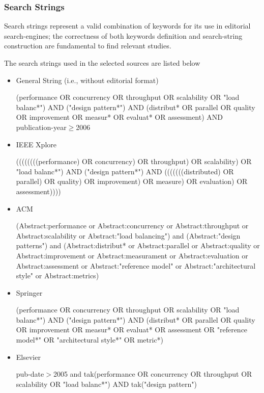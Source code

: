 \subsubsection{Search Strings}
\label{subsec:searchstrings}
Search strings represent a valid combination of keywords for its use in editorial search-engines; the correctness of both keywords definition and search-string construction are fundamental to find relevant studies.

The search strings used in the selected sources are listed below


\begin{itemize}
	
	\item General String (i.e., without editorial format)
	
	(performance OR concurrency OR throughput OR scalability OR "load balanc*") AND ("design pattern*") AND (distribut* OR parallel OR quality OR improvement OR measur* OR evaluat* OR assessment) AND publication-year$\geq$2006 \label{seastr:general} 
	
	\item IEEE Xplore
	
	((((((((performance) OR concurrency) OR throughput) OR scalability) OR "load balanc*") AND ("design pattern*") AND (((((((distributed) OR parallel) OR quality) OR improvement) OR measure) OR evaluation) OR assessment)))) \label{seastr:IEEE} 
	
	\item ACM
	
	(Abstract:performance or Abstract:concurrency or Abstract:throughput or Abstract:scalability or Abstract:"load balancing") and (Abstract:"design patterns") and (Abstract:distribut* or Abstract:parallel or Abstract:quality or Abstract:improvement or Abstract:measurament or Abstract:evaluation or Abstract:assessment or Abstract:"reference model" or Abstract:"architectural style" or Abstract:metrics) \label{seastr:ACM} 
	
	\item Springer
	
	(performance OR concurrency OR throughput OR scalability OR "load balanc*") AND ("design pattern*") AND (distribut* OR parallel OR quality OR improvement OR measur* OR evaluat* OR assessment OR "reference model*" OR "architectural style*" OR metric*) \label{seastr:Springer} 
	
	\item Elsevier
	
	pub-date$>$2005 and tak(performance OR concurrency OR throughput OR scalability OR "load balanc*") AND tak("design pattern") \label{seastr:Elsevier} 
	
\end{itemize}

